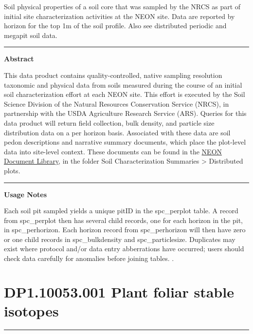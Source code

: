 \documentclass[]{article}
\begin{document}
Soil physical properties of a soil core that was sampled by the NRCS as
part of initial site characterization activities at the NEON site. Data
are reported by horizon for the top 1m of the soil profile. Also see
distributed periodic and megapit soil data.

\begin{center}\rule{0.5\linewidth}{\linethickness}\end{center}

\textbf{Abstract}

This data product contains quality-controlled, native sampling
resolution taxonomic and physical data from soils measured during the
course of an initial soil characterization effort at each NEON site.
This effort is executed by the Soil Science Division of the Natural
Resources Conservation Service (NRCS), in partnership with the USDA
Agriculture Research Service (ARS). Queries for this data product will
return field collection, bulk density, and particle size distribution
data on a per horizon basis. Associated with these data are soil pedon
descriptions and narrative summary documents, which place the plot-level
data into site-level context. These documents can be found in the
\href{http://data.neonscience.org/documents}{NEON Document Library}, in
the folder Soil Characterization Summaries \textgreater{} Distributed
plots.

\begin{center}\rule{0.5\linewidth}{\linethickness}\end{center}

\textbf{Usage Notes}

Each soil pit sampled yields a unique pitID in the spc\_perplot table. A
record from spc\_perplot then has several child records, one for each
horizon in the pit, in spc\_perhorizon. Each horizon record from
spc\_perhorizon will then have zero or one child records in
spc\_bulkdensity and spc\_particlesize. Duplicates may exist where
protocol and/or data entry abberrations have occurred; users should
check data carefully for anomalies before joining tables. \newpage
.

\section{DP1.10053.001 Plant foliar stable
isotopes}\label{dp1.10053.001-plant-foliar-stable-isotopes}

\begin{center}\rule{0.5\linewidth}{\linethickness}\end{center}
\end{document}
